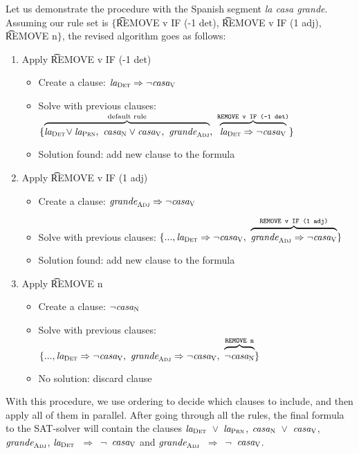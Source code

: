 Let us demonstrate the procedure with the Spanish segment {\em la casa grande}.
Assuming our rule set is $\{$\t{REMOVE v IF (-1 det)}, \t{REMOVE v IF (1 adj)}, \t{REMOVE n}$\}$, the revised algorithm goes as follows:


\begin{enumerate}
\item Apply \t{REMOVE v IF (-1 det)}
 \begin{itemize}
    \item Create a clause: $\text{\em la}_{\text{\sc Det}} \Rightarrow \neg \text{\em casa}_{\text{\sc V}}$
    \item Solve with previous clauses:
  $\{ \ob{\laDet \! \vee \laPrn, \ \casaN \vee \casaV, \  \grandeAdj}^{\text{default rule}}, \ 
      \ob{\laDet \Rightarrow \neg \casaV}^{\t{REMOVE v IF (-1 det)}} \}$
    \item Solution found: add new clause to the formula
 \end{itemize}
\item Apply \t{REMOVE v IF (1 adj)} 
 \begin{itemize}
    \item Create a clause: $\text{\em grande}_{\text{\sc Adj}} \Rightarrow \neg \text{\em casa}_{\text{\sc V}}$
    \item Solve with previous clauses:
  $\{..., \laDet \Rightarrow \neg \casaV, \ 
      \ob{\grandeAdj \Rightarrow \neg \casaV}^{\t{REMOVE v IF (1 adj)}}  \}$
    \item Solution found: add new clause to the formula
 \end{itemize}
\item Apply \t{REMOVE n}
 \begin{itemize}
    \item Create a clause: $\neg \text{\em casa}_{\text{\sc N}}$
    \item Solve with previous clauses:
      $\{ ..., \laDet \Rightarrow \neg \casaV, \ 
      \grandeAdj \Rightarrow \neg \casaV, \ 
      \ob{\neg \casaN}^{\t{REMOVE n}} \}$
    \item No solution: discard clause
 \end{itemize}

\end{enumerate}

With this procedure, we use ordering to decide which clauses to include, and
then apply all of them in parallel.
After going through all the rules, the final formula to the SAT-solver will contain the clauses  
$\text{\em la}_{\text{\sc Det}}$~$\vee$~$\text{\em la}_{\text{\sc Prn}}$, $\text{\em casa}_{\text{\sc N}}$~$\vee$~$\text{\em casa}_{\text{\sc V}}$,  $\text{\em grande}_{\text{\sc Adj}}$, $\text{\em la}_{\text{\sc Det}}$~$\Rightarrow$~$\neg$~$\text{\em casa}_{\text{\sc V}}$ and $\text{\em grande}_{\text{\sc Adj}}$~$\Rightarrow$~$\neg$~$\text{\em casa}_{\text{\sc V}}$.





